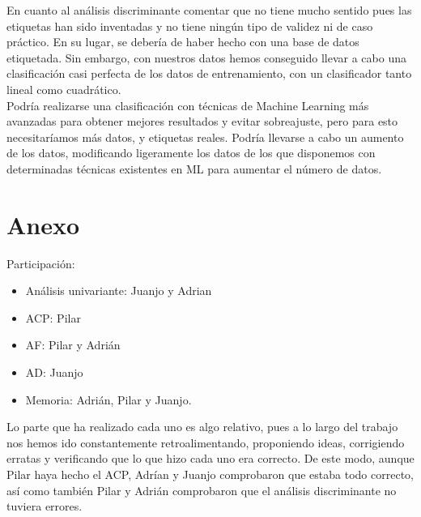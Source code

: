 \documentclass[11pt,a4paper]{article}
\begin{document}
    En cuanto al análisis discriminante comentar que no tiene mucho sentido pues las etiquetas han sido inventadas y no tiene ningún tipo de validez ni de caso práctico. En su lugar, se debería de haber hecho con una base de datos etiquetada. Sin embargo, con nuestros datos hemos conseguido llevar a cabo una clasificación casi perfecta de los datos de entrenamiento, con un clasificador tanto lineal como cuadrático.\\
    
    Podría realizarse una clasificación con técnicas de Machine Learning más avanzadas para obtener mejores resultados y evitar sobreajuste, pero para esto necesitaríamos más datos, y etiquetas reales. Podría llevarse a cabo un aumento de los datos, modificando ligeramente los datos de los que disponemos con determinadas técnicas existentes en ML para aumentar el número de datos. 
    \\  
	
	

    \section{Anexo}
    
    Participación:
    
    \begin{itemize}
        \item Análisis univariante: Juanjo y Adrian
        \item ACP: Pilar 
        \item AF: Pilar y Adrián
        \item AD: Juanjo
        \item Memoria: Adrián, Pilar y Juanjo.
    \end{itemize}
    
    Lo parte que ha realizado cada uno es algo relativo, pues a lo largo del trabajo nos hemos ido constantemente retroalimentando, proponiendo ideas, corrigiendo erratas y verificando que lo que hizo cada uno era correcto. De este modo, aunque Pilar haya hecho el ACP, Adrían y Juanjo comprobaron que estaba todo correcto, así como también Pilar y Adrián comprobaron que el análisis discriminante no tuviera errores.

    
    
    
	
	
\end{document}

